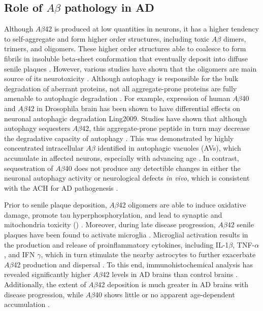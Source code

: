 \subsection{Role of $A\beta$ pathology in AD}
Although $A\beta$42 is produced at low quantities in neurons, it has a higher tendency to self-aggregate and form higher order structures, including toxic $A\beta$ dimers, trimers, and oligomers. These higher order structures able to coalesce to form fibrils in insoluble beta-sheet conformation that eventually deposit into diffuse senile plaques \citep{Burdick1992,Gravina1995}. However, various studies have shown that the oligomers are main source of its neurotoxicity \citep{Shankar2008,Shankar2009}. Although autophagy is responsible for the bulk degradation of aberrant proteins, not all aggregate-prone proteins are fully amenable to autophagic degradation \citep{Wong2008}. For example, expression of human $A\beta$40 and $A\beta$42 in Drosophila brain has been shown to have differential effects on neuronal autophagic degradation {Ling2009}. Studies have shown that although autophagy sequesters $A\beta$42, this aggregate-prone peptide in turn may decrease the degradative capacity of autophagy \citep{Ling2014,Ling2011}. This was demonstrated by highly concentrated intracellular $A\beta$ identified in autophagic vacuoles (AVs), which accumulate in affected neurons, especially with advancing age \citep{Ling2011}. In contrast, sequestration of $A\beta$40 does not produce any detectible changes in either the neuronal autophagy activity or neurological defects \textit{in vivo}, which is consistent with the ACH for AD pathogenesis \citep{Hardy1992}.

Prior to senile plaque deposition, $A\beta$42 oligomers are able to induce oxidative damage, promote tau hyperphosphorylation, and lead to synaptic and mitochondria toxicity () \citep{Kaminsky2015,Lustbader2004}. Moreover, during late disease progression, $A\beta$42 senile plaques have been found to activate microglia \citep{Rosenmann2013}. Microglial activation results in the production and release of proinflammatory cytokines, including IL-1$\beta$, TNF-$\alpha$, and IFN $\gamma$, which in turn stimulate the nearby astrocytes to further exacerbate $A\beta$42 production and dispersal \citep{DalPra2015}. To this end, immunohistochemical analysis has revealed significantly higher $A\beta$42 levels in AD brains than control brains \citep{Funato1998}. Additionally, the extent of $A\beta$42 deposition is much greater in AD brains with disease progression, while $A\beta$40 shows little or no apparent age-dependent accumulation \citep{Funato1998}.

